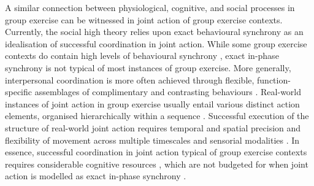 \begin{CJK}{UTF8}{gbsn}
A similar connection between physiological, cognitive, and social processes in group exercise can be witnessed in joint action of group exercise contexts.  Currently, the social high theory relies upon exact behavioural synchrony as an idealisation of successful coordination in joint action.  While some group exercise contexts do contain high levels of behavioural synchrony \citep[rowing, synchronised swimming, diving, mass calisthenics, and forms of dance such as ballet, see][]{McNeill1995}, exact in-phase synchrony is not typical of most instances of group exercise.  More generally, interpersonal coordination is more often achieved through flexible, function-specific assemblages of complimentary and contrasting behaviours \citep[for example, coordination in an interactional team sport, a dyadic conversation, or an ensemble music performance, see][]{Fusaroli2014}.  Real-world instances of joint action in group exercise usually entail various distinct action elements, organised hierarchically within a sequence \citep{Schmidt1975,Rosenbaum2009}.  Successful execution of the structure of real-world joint action requires temporal and spatial precision and flexibility of movement across multiple timescales and sensorial modalities \citep{Sebanz2006,Pacherie2012}.  In essence, successful coordination in joint action typical of group exercise contexts requires considerable cognitive resources \citep{Turvey1978}, which are not budgeted for when joint action is modelled as exact in-phase synchrony \citep{Keller2014}.



\end{CJK}
